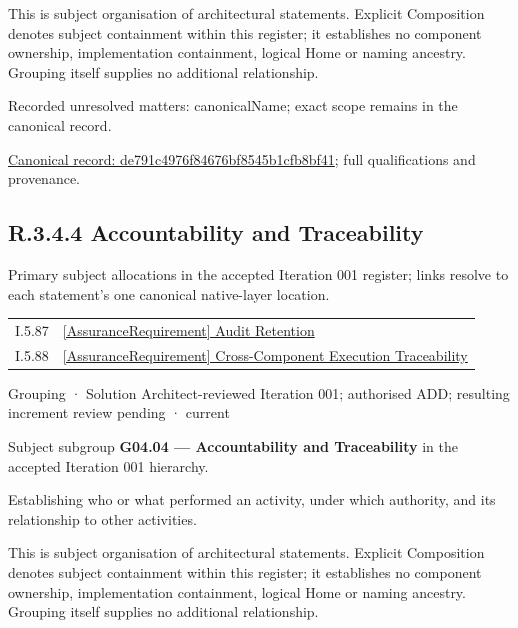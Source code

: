 This is subject organisation of architectural statements. Explicit Composition denotes subject containment within this register; it establishes no component ownership, implementation containment, logical Home or naming ancestry. Grouping itself supplies no additional relationship.


{\small Recorded unresolved matters: canonicalName; exact scope remains in the canonical record.}\par
{\footnotesize \href{../../../../continuum/grouping/de791c4976f84676bf8545b1cfb8bf41.md}{Canonical record: de791c4976f84676bf8545b1cfb8bf41}; full qualifications and provenance.}\par
\subsection*{R.3.4.4 Accountability and Traceability}
\label{navigation:R.3.4.4}

Primary subject allocations in the accepted Iteration 001 register; links resolve to each statement’s one canonical native-layer location.\par
\begin{longtable}{p{.22\linewidth}p{.73\linewidth}}
I.5.87 & \hyperref[element:44b1a897fd1a41c097a1138bfee9cea6]{[AssuranceRequirement] Audit Retention} \\
I.5.88 & \hyperref[element:8014fbaa48b5435785fced72aa748da6]{[AssuranceRequirement] Cross-Component Execution Traceability} \\
\end{longtable}
\label{element:38d3dfcd23894f43b59d00c782170e63}
{\small Grouping · Solution Architect-reviewed Iteration 001; authorised ADD; resulting increment review pending · current}\par

Subject subgroup \textbf{G04.04 — Accountability and Traceability} in the accepted Iteration 001 hierarchy.



Establishing who or what performed an activity, under which authority, and its relationship to other activities.



This is subject organisation of architectural statements. Explicit Composition denotes subject containment within this register; it establishes no component ownership, implementation containment, logical Home or naming ancestry. Grouping itself supplies no additional relationship.


